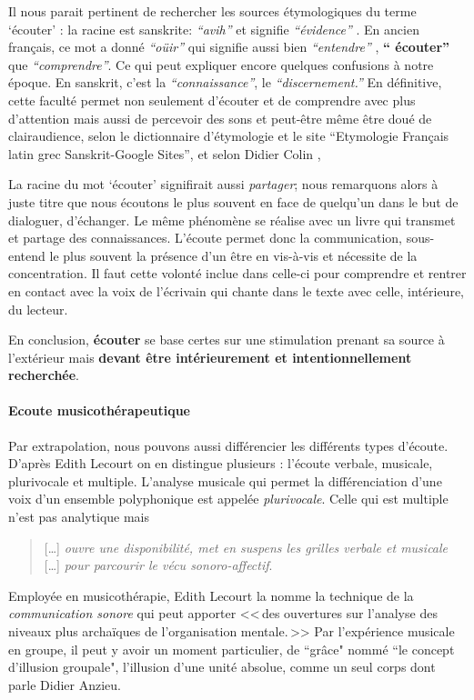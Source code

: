 Il nous parait pertinent de rechercher les sources étymologiques du
terme `écouter' :
 la racine est sanskrite:  \emph{ ``avih'' }  et signifie  \emph{``évidence'' }. En ancien
 français, ce mot a donné \textit{``oüir''} qui signifie aussi bien \textit{``entendre''} ,
\textbf{`` écouter'' } que \textit{``comprendre''}. Ce qui peut
expliquer encore quelques confusions à notre époque. En sanskrit, c'est la
\textit{``connaissance''}, le \textit{``discernement.''}
En définitive, cette faculté
permet non seulement d'écouter et de comprendre avec plus d'attention
mais aussi de percevoir des sons et peut-être même être doué de
clairaudience, selon le dictionnaire d'étymologie et le site
``Etymologie Français latin grec Sanskrit-Google Sites'', et selon Didier
Colin \autocite{Didier Colin,2015 ``Interprétez vos rêves''},


  La racine du mot `écouter' signifirait aussi \emph{partager}; nous
  remarquons alors à juste titre que nous écoutons le plus souvent en
  face de quelqu'un dans le but de dialoguer, d'échanger. Le même
  phénomène se réalise avec un livre qui transmet et partage des
  connaissances. L'écoute permet donc la communication, sous-entend le
  plus souvent la présence d'un être en vis-à-vis et nécessite de la
  concentration. Il faut cette volonté inclue dans celle-ci  pour
  comprendre et rentrer en contact avec la voix de  l'écrivain qui
  chante dans le texte avec celle, intérieure, du lecteur.

  
En conclusion, \textbf{écouter} se base certes sur une stimulation prenant sa source à 
l'extérieur mais \textbf{devant être intérieurement et  intentionnellement
	recherchée}.




      \paragraph{Ecoute musicothérapeutique}
      

Par extrapolation, nous pouvons aussi différencier les différents types d'écoute. D'après Edith Lecourt \autocite[ch. 10 <<\,De l'écoute verbale à l'écoute musicale\,>>, p. 182.]{lecourt:decouvrir}
 on en distingue plusieurs : l'écoute verbale, musicale, plurivocale et multiple.
 L'analyse musicale qui permet la différenciation d'une voix d'un ensemble polyphonique est appelée \emph{plurivocale}. Celle qui est multiple n'est pas analytique  mais 
 \begin{quote}
 	 [\ldots] \textit{ouvre une disponibilité, met en suspens les grilles verbale et musicale} [\ldots] \emph{pour parcourir le vécu sonoro-affectif}\autocite[p. 183]{lecourt:decouvrir}.
 \end{quote}
 Employée en musicothérapie, Edith Lecourt la nomme la technique de la  \emph{communication sonore} qui peut apporter 
 <<\,des ouvertures sur l'analyse des niveaux plus archaïques de l'organisation mentale.\,>>\autocite[p. 154]{lecourt:decouvrir}	
 Par l'expérience musicale en groupe, il peut y avoir un moment particulier, de ``grâce"  nommé ``le concept d'illusion groupale", l'illusion d'une unité absolue, comme un seul corps\autocite{anzieu:groupal} dont parle Didier Anzieu.


